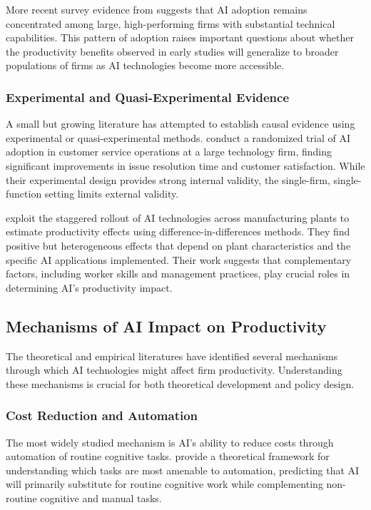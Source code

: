 \documentclass[12pt, a4paper]{article}
\begin{document}
More recent survey evidence from \citet{mit2021artificial} suggests that AI adoption remains concentrated among large, high-performing firms with substantial technical capabilities. This pattern of adoption raises important questions about whether the productivity benefits observed in early studies will generalize to broader populations of firms as AI technologies become more accessible.

\subsubsection{Experimental and Quasi-Experimental Evidence}

A small but growing literature has attempted to establish causal evidence using experimental or quasi-experimental methods. \citet{chen2021artificial} conduct a randomized trial of AI adoption in customer service operations at a large technology firm, finding significant improvements in issue resolution time and customer satisfaction. While their experimental design provides strong internal validity, the single-firm, single-function setting limits external validity.

\citet{babina2024artificial} exploit the staggered rollout of AI technologies across manufacturing plants to estimate productivity effects using difference-in-differences methods. They find positive but heterogeneous effects that depend on plant characteristics and the specific AI applications implemented. Their work suggests that complementary factors, including worker skills and management practices, play crucial roles in determining AI's productivity impact.

\subsection{Mechanisms of AI Impact on Productivity}

The theoretical and empirical literatures have identified several mechanisms through which AI technologies might affect firm productivity. Understanding these mechanisms is crucial for both theoretical development and policy design.

\subsubsection{Cost Reduction and Automation}

The most widely studied mechanism is AI's ability to reduce costs through automation of routine cognitive tasks. \citet{autor2003skill} provide a theoretical framework for understanding which tasks are most amenable to automation, predicting that AI will primarily substitute for routine cognitive work while complementing non-routine cognitive and manual tasks.
\end{document}
